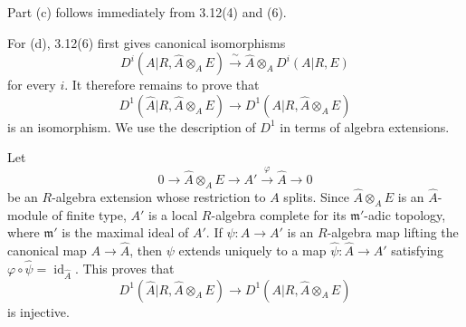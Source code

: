 Part (c) follows immediately from 3.12(4) and (6).


For (d), 3.12(6) first gives canonical isomorphisms
\[
 D^i(A|R,\widehat A\otimes_AE)
 \xrightarrow{\ \sim\ }
 \widehat A\otimes_AD^i(A|R,E)
\]
for every $i$. It therefore remains to prove that
\[
 D^1(\widehat A|R,\widehat A\otimes_AE)
 \longrightarrow D^1(A|R,\widehat A\otimes_AE)
\]
is an isomorphism. We use the description of $D^1$ in terms of
algebra extensions.

Let
\[
 0\longrightarrow\widehat A\otimes_AE\longrightarrow A'
 \xrightarrow{\ \varphi\ }\widehat A\longrightarrow0
\]
be an $R$-algebra extension whose restriction to $A$ splits. Since
$\widehat A\otimes_AE$ is an $\widehat A$-module of finite type,
$A'$ is a local $R$-algebra complete for its $\mathfrak m'$-adic
topology, where $\mathfrak m'$ is the maximal ideal of $A'$. If
$\psi:A\longrightarrow A'$ is an $R$-algebra map lifting the
canonical map $A\longrightarrow\widehat A$, then $\psi$ extends
uniquely to a map
$\widehat\psi:\widehat A\longrightarrow A'$ satisfying
$\varphi\circ\widehat\psi=\operatorname{id}_{\widehat A}$.
This proves that
\[
 D^1(\widehat A|R,\widehat A\otimes_AE)
 \longrightarrow D^1(A|R,\widehat A\otimes_AE)
\]
is injective.


